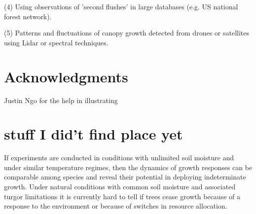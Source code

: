 \documentclass{article}
\begin{document}
	(4) Using observations of 'second flushes' in large databases (e.g. US national forest network). 
	
	(5) Patterns and fluctuations of canopy growth detected from drones or satellites using Lidar or spectral techniques.
	

	

	
\section*{Acknowledgments}
	Justin Ngo for the help in illustrating
	


	
	

	
	\pagebreak
	

	\newpage
\section*{stuff I did't find place yet}

	
If experiments are conducted in conditions with unlimited soil moisture and under similar temperature regimes, then the dynamics of growth responses can be comparable among species and reveal their potential in deploying indeterminate growth. Under natural conditions with common soil moisture and associated turgor limitations it is currently hard to tell if trees cease growth because of a response to the environment or because of switches in resource allocation. 

 
	

	
	\newpage
	
	
	
	
	
	
\end{document}
